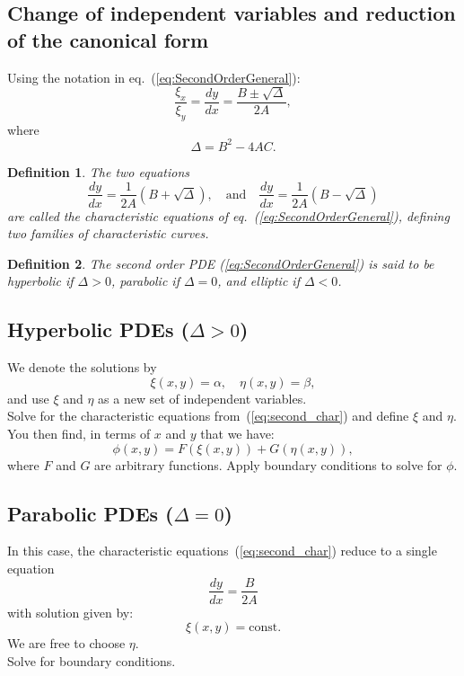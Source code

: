 \documentclass{article}
\newtheorem{definition}{Definition}
\begin{document}
\subsection{Change of independent variables and reduction of the canonical form}
Using the notation in eq.~(\ref{eq:SecondOrderGeneral}):
\begin{equation}
    \frac{\xi_x}{\xi_y} = \frac{dy}{dx} = \frac{B \pm \sqrt{\Delta}}{2A},
\end{equation}
where 
\begin{equation}
    \Delta = B^2 -4AC.
\end{equation}
\begin{definition}
    The two equations
    \begin{equation}
        \frac{dy}{dx} = \frac{1}{2A} (B+\sqrt{\Delta}),\quad\text{and}\quad \frac{dy}{dx} = \frac{1}{2A}(B-\sqrt{\Delta})\label{eq:second_char}
    \end{equation}
    are called the characteristic equations of eq.~(\ref{eq:SecondOrderGeneral}), defining two families of characteristic curves.
\end{definition}
\begin{definition}
    The second order PDE (\ref{eq:SecondOrderGeneral}) is said to be hyperbolic if $\Delta>0$, parabolic if $\Delta = 0$, and elliptic if $\Delta<0$.
\end{definition}


\subsection{Hyperbolic PDEs ($\Delta > 0$)}
We denote the solutions by
\begin{equation}
    \xi(x,y) = \alpha,\quad\eta(x,y)=\beta,
\end{equation}
and use $\xi$ and $\eta$ as a new set of independent variables.\\
Solve for the characteristic equations from~(\ref{eq:second_char}) and define $\xi$ and $\eta$. You then find, in terms of $x$ and $y$ that we have:
\begin{equation}
    \phi(x,y) = F(\xi(x,y)) + G(\eta(x,y)),
\end{equation}
where $F$ and $G$ are arbitrary functions. Apply boundary conditions to solve for $\phi$.


\subsection{Parabolic PDEs ($\Delta = 0$)}
In this case, the characteristic equations~(\ref{eq:second_char}) reduce to a single equation
\begin{equation}
    \frac{dy}{dx} = \frac{B}{2A} \nonumber
\end{equation}
with solution given by:
\begin{equation}
    \xi(x,y) = \text{const.} \nonumber
\end{equation}
We are free to choose $\eta$.\\
Solve for boundary conditions.
\end{document}
